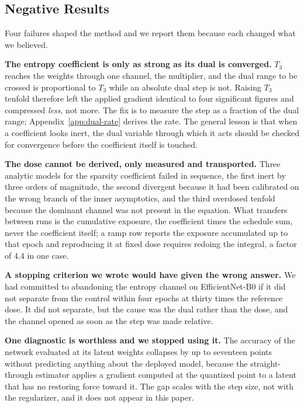 \documentclass{article}
\begin{document}
\subsection{Negative Results}
\label{sec:negative}

Four failures shaped the method and we report them because each changed what we
believed.

\textbf{The entropy coefficient is only as strong as its dual is converged.}
$T_3$ reaches the weights through one channel, the multiplier, and the dual range
to be crossed is proportional to $T_3$ while an absolute dual step is not.
Raising $T_3$ tenfold therefore left the applied gradient identical to four
significant figures and compressed \emph{less}, not more. The fix is to measure
the step as a fraction of the dual range; Appendix~\ref{app:dual-rate} derives the
rate. The general lesson is that when a coefficient looks inert, the dual
variable through which it acts should be checked for convergence before the
coefficient itself is touched.

\textbf{The dose cannot be derived, only measured and transported.} Three
analytic models for the sparsity coefficient failed in sequence, the first inert
by three orders of magnitude, the second divergent because it had been calibrated
on the wrong branch of the inner asymptotics, and the third overdosed tenfold
because the dominant channel was not present in the equation. What transfers between runs is the cumulative
exposure, the coefficient times the schedule sum, never the coefficient itself;
a ramp row reports the exposure accumulated up to that epoch and reproducing it
at fixed dose requires redoing the integral, a factor of $4.4$ in one case.

\textbf{A stopping criterion we wrote would have given the wrong answer.} We had
committed to abandoning the entropy channel on EfficientNet-B0 if it did not
separate from the control within four epochs at thirty times the reference dose.
It did not separate, but the cause was the dual rather than the dose, and the
channel opened as soon as the step was made relative.

\textbf{One diagnostic is worthless and we stopped using it.} The accuracy of the
network evaluated at its latent weights collapses by up to seventeen points
without predicting anything about the deployed model, because the straight-through
estimator applies a gradient computed at the quantized point to a latent that has
no restoring force toward it. The gap scales with the step size, not with the
regularizer, and it does not appear in this paper.
\end{document}
